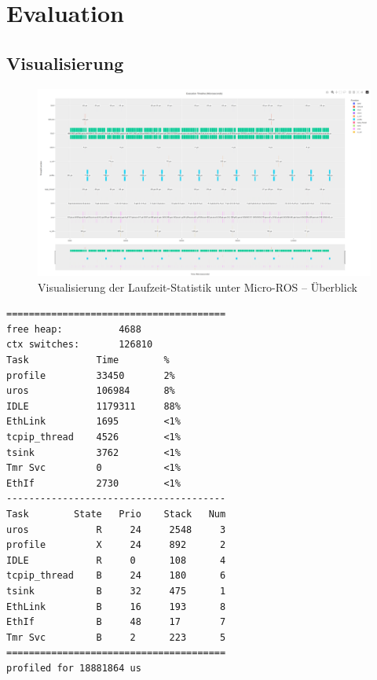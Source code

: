 \section{Evaluation}

\subsection{Visualisierung}

\begin{figure}[h]
    \centering
    \includegraphics[width=1\textwidth]{assets/micro_ros_profiling}
    \caption{Visualisierung der Laufzeit-Statistik unter Micro-ROS -- Überblick}
    \label{fig:micro_ros_profiling}
\end{figure}

\begin{code}
\begin{verbatim}
=======================================
free heap:          4688
ctx switches:       126810
Task            Time        %
profile         33450       2%
uros            106984      8%
IDLE            1179311     88%
EthLink         1695        <1%
tcpip_thread    4526        <1%
tsink           3762        <1%
Tmr Svc         0           <1%
EthIf           2730        <1%
---------------------------------------
Task        State   Prio    Stack   Num
uros            R     24     2548     3
profile         X     24     892      2
IDLE            R     0      108      4
tcpip_thread    B     24     180      6
tsink           B     32     475      1
EthLink         B     16     193      8
EthIf           B     48     17       7
Tmr Svc         B     2      223      5
=======================================
profiled for 18881864 us
\end{verbatim}
    \label{code:freertos_summary_uros}
\end{code}

